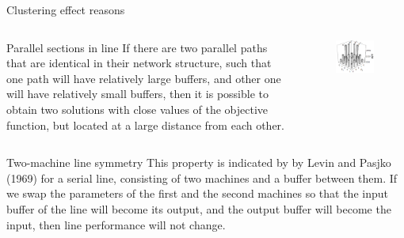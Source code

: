\documentclass[aspectratio=169,xcolor=dvipsnames]{beamer}
\begin{document}
\begin{frame}{Clustering effect reasons}
\begin{columns}
    \begin{block}{Parallel sections in line}
        If there are two parallel paths that are identical in their network structure,
such that one path will have relatively large buffers, and other one will have relatively small buffers, then 
it is possible to obtain two solutions with close values of the objective function, but located at a large distance from each other.
    \end{block}
     \begin{figure}
    \includegraphics[scale=0.6]{test}
    \end{figure}
 \end{columns}
    \begin{block}{Two-machine line symmetry}
        This property is indicated by  by Levin and Pasjko
(1969) for a serial line,
consisting of two machines and a buffer
between them. If we swap the parameters of the first and the second machines so 
that the input buffer of the line will become its output, and the output buffer will become the input, then
line performance will not change.
    \end{block}
   
\end{frame}
\end{document}

